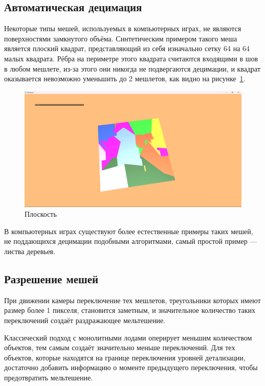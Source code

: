 \subsection*{Автоматическая децимация}
Некоторые типы мешей, используемых в компьютерных играх, не являются поверхностями замкнутого объёма.
Синтетическим примером такого меша является плоский квадрат, представляющий из себя изначально сетку 64 на 64 малых квадрата.
Рёбра на периметре этого квадрата считаются входящими в шов в любом мешлете, из-за этого они никогда не подвергаются децимации, и квадрат оказывается невозможно уменьшить до 2 мешлетов, как видно на рисунке~\ref{fig:plane-1}.
\begin{figure}[H]
    \centering
    \includegraphics[width=\textwidth]{pics/plane1.png}
    \caption{Плоскость}
    \label{fig:plane-1}
\end{figure}

В компьютерных играх существуют более естественные примеры таких мешей, не поддающихся децимации подобными алгоритмами, самый простой пример --- листва деревьев.

\subsection*{Разрешение мешей}
При движении камеры переключение тех мешлетов, треугольники которых имеют размер более 1 пикселя, становится заметным, и значительное количество таких переключений создаёт раздражающее мельтешение.

Классический подход с монолитными лодами оперирует меньшим количеством объектов, тем самым создаёт значительно меньше переключений.
Для тех объектов, которые находятся на границе переключения уровней детализации, достаточно добавить информацию о моменте предыдущего переключения, чтобы предотвратить мельтешение.

